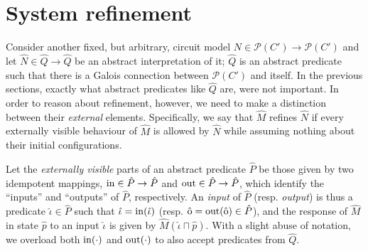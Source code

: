 \section{System refinement}

Consider another fixed, but arbitrary, circuit model $N \in \mathcal{P}(C') \rightarrow \mathcal{P}(C')$ and let $\hat N \in \hat Q \rightarrow \hat Q$ be an abstract interpretation of it; $\hat Q$ is an abstract predicate such that there is a Galois connection between $\mathcal{P}(C')$ and itself. In the previous sections, exactly what abstract predicates like $\hat Q$ are, were not important. In order to reason about refinement, however, we need to make a distinction between their \textit{external} elements. Specifically, we say that $\hat M$ refines $\hat N$ if every externally visible behaviour of $\hat M$ is allowed by $\hat N$ while assuming nothing about their initial configurations.

Let the \textit{externally visible} parts of an abstract predicate $\hat P$ be those given by two idempotent mappings, $\operatorname{in} \in \hat P \rightarrow \hat P$ and $\operatorname{out} \in \hat P \rightarrow \hat P$, which identify the ``inputs'' and ``outputs'' of $\hat P$, respectively. An \textit{input} of $\hat P$ (resp. \textit{output}) is thus a predicate $\hat \iota \in \hat P$ such that $\hat \iota = \operatorname{in}(\hat \iota)$ (resp. $\hat {\mathrm{o}} = \operatorname{out}(\hat {\mathrm{o}}) \in \hat P$), and the response of $\hat M$ in state $\hat p$ to an input $\hat \iota$ is given by $\hat M(\hat \iota \sqcap \hat p)$. With a slight abuse of notation, we overload both $\operatorname{in}(\cdot)$ and $\operatorname{out}(\cdot)$ to also accept predicates from $\hat Q$.





